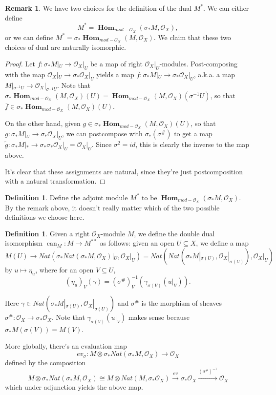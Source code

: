 \documentclass[edeposit,fullpage]{uiucthesis2009}
\newcommand{\mc}{\mathcal}
\DeclareMathOperator{\can}{can}
\DeclareMathOperator{\iHom}{\mathbf{Hom}}
\theoremstyle{plain}
\numberwithin{lemma}{section}
\theoremstyle{definition}
\newtheorem{definition}[lemma]{Definition}
\newtheorem{remark}[lemma]{Remark}
\begin{document}
\begin{remark}
We have two choices for the definition of the dual $M^*$. We can
either define 
\[
M^* = \iHom_{mod-\mc O_X}(\sigma_*M,\mc O_X),
\] 
or we can
define $M^* = \sigma_* \iHom_{mod-\mc O_X}(M,\mc O_X)$. We claim that
these two choices of dual are naturally isomorphic. 
\end{remark}



\begin{proof}
Let $f : \sigma_*M|_U \rightarrow \mc O_X|_U$ be a map of right $\mc
O_X|_U$-modules. Post-composing with the map $\mc O_X|_U \rightarrow
\sigma_* \mc O_X|_U$ yields a map $\overline f : \sigma_*M|_U
\rightarrow \sigma_*\mc O_X|_U$, a.k.a. a map $M|_{\sigma^{-1}U}
\rightarrow \mc O_X|_{\sigma^{-1}U}$. Note that $\sigma_*\iHom_{mod-\mc
  O_X}(M,\mc O_X)(U) = \iHom_{mod-\mc
  O_X}(M,\mc O_X)(\sigma^{-1}U)$, so that $\overline f \in \sigma_*\iHom_{mod-\mc
  O_X}(M,\mc O_X)(U)$.

On the other hand, given $g \in \sigma_*\iHom_{mod-\mc O_X}(M,\mc
O_X)(U)$, so that $g : \sigma_*M|_U
\rightarrow \sigma_*\mc O_X|_U$, we can postcompose with
$\sigma_*(\sigma^\#)$ to get a map $\widetilde g : \sigma_*M|_*
\rightarrow \sigma_*\sigma_*\mc O_X|_U = \mc O_X|_U$. Since $\sigma^2
= id$, this is clearly the inverse to the map above. 

It's clear that these assignments are natural, since they're just
postcomposition with a natural transformation. 
\end{proof}

\begin{definition}
Define the adjoint module $M^*$ to be $\iHom_{mod-\mc O_X}(\sigma_*M,\mc
O_X)$. By the remark above, it doesn't really matter which of the two
possible definitions we choose here. 
\end{definition}


\begin{definition}\label{def:double_dual_iso}
Given a right $\mc O_X$-module $M$, we define the double dual
isomorphism $\can_M : M \rightarrow M^{**}$ as follows: given an open $U
\subseteq X$, we define a map
\[
M(U) \rightarrow Nat(\sigma_* Nat(\sigma_* M,\mc O_X)|_U, \mc O_X|_U)
= Nat(Nat(\sigma_* M|_{\sigma(U)}, \mc O_X|_{\sigma(U)}),\mc O_X|_U)
\]
by $u \mapsto \eta_u$, where for an open $V \subseteq U$,
\[
(\eta_u)_V(\gamma) = (\sigma^\#)_{V}^{-1}(\gamma_{\sigma(V)}(u|_V)).
\]

Here $\gamma \in Nat(\sigma_* M|_{\sigma(U)}, \mc
O_X|_{\sigma(U)})$ and $\sigma^\#$ is the morphism of sheaves
$\sigma^\# : \mc O_X \rightarrow \sigma_* \mc O_X$. Note that $\gamma_{\sigma(V)}(u|_V)$ makes sense
because $\sigma_*M(\sigma(V)) = M(V)$.

More globally, there's an evaluation map
\[
ev_\sigma : M \otimes \sigma_*Nat(\sigma_*M,\mc O_X) \rightarrow \mc O_X
\]
defined by the composition
\[
M \otimes \sigma_*Nat(\sigma_*M,\mc O_X) \cong M \otimes
Nat(M,\sigma_*\mc O_X) \xrightarrow{ ev} \sigma_* \mc O_X
\xrightarrow{(\sigma^\#)^{-1}} \mc O_X
\]
which under adjunction yields the above map. 
\end{definition}
\end{document}

